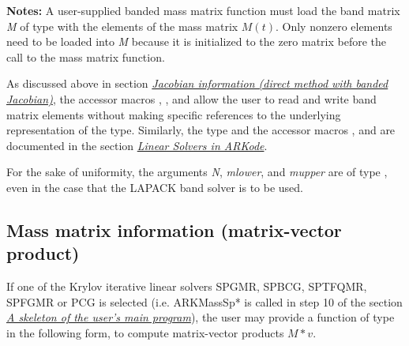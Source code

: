 \documentclass[letterpaper,10pt,english]{sphinxmanual}
\begin{document}
\begin{fulllineitems}
\textbf{Notes:} A user-supplied banded mass matrix function must load
the band matrix \emph{M} of type  with the elements of the
mass matrix $M(t)$. Only nonzero elements need to be loaded
into \emph{M} because it is initialized to the zero matrix before the
call to the mass matrix function.

As discussed above in section {\hyperref[c_interface/User_supplied:cinterface-bandjacobianfn]{\emph{Jacobian information (direct method with banded Jacobian)}}},
the accessor macros , , and
 allow the user to read and write band matrix
elements without making specific references to the underlying
representation of the  type.  Similarly, the 
type and the accessor macros ,  and
 are documented in the section
{\hyperref[linear_solvers/index:linearsolvers]{\emph{Linear Solvers in ARKode}}}.

For the sake of uniformity, the arguments \emph{N}, \emph{mlower}, and
\emph{mupper} are of type , even in the case that the
LAPACK band solver is to be used.

\end{fulllineitems}



\subsection{Mass matrix information (matrix-vector product)}
\label{c_interface/User_supplied:mass-matrix-information-matrix-vector-product}\label{c_interface/User_supplied:cinterface-mtimesfn}
If one of the Krylov iterative linear solvers SPGMR, SPBCG, SPTFQMR,
SPFGMR or PCG is selected (i.e. ARKMassSp* is called in step 10 of the
section {\hyperref[c_interface/Skeleton:cinterface-skeleton]{\emph{A skeleton of the user's main program}}}), the user may provide a function
of type {\hyperref[c_interface/User_supplied:ARKSpilsMassTimesVecFn]{}} in the following form, to
compute matrix-vector products $M*v$.
\end{document}
